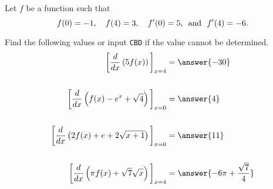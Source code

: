 \documentclass{ximera}
\author{Nela Lakos \and Kyle Parsons}
\begin{document}
\begin{exercise}

Let $f$ be a function such that
\[
f(0) = -1,\quad f(4) = 3,\quad f'(0) = 5\text{, \phantom{} and \phantom{} }f'(4) = -6.
\]

Find the following values or input \verb|CBD| if the value cannot be determined.
\begin{align*}
	\eval{\ddx\left(5f(x)\right)}_{x=4} &= \answer{-30}\\
	\\
	\eval{\ddx\left(f(x) - e^x + \sqrt{4}\right)}_{x=0} &= \answer{4}\\
	\\
	\eval{\ddx\left(2f(x) + e + 2\sqrt{x+1}\right)}_{x=0} &= \answer{11}\\
	\\
	\eval{\ddx\left(\pi f(x) + \sqrt{7}\sqrt{x}\right)}_{x=4} &= \answer{-6\pi + \frac{\sqrt{7}}{4}}
\end{align*}

\end{exercise}
\end{document}
